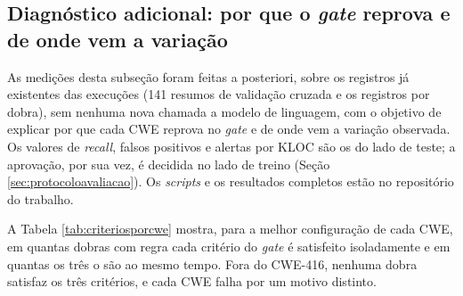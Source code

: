 \documentclass[
    12pt,                %
    openright,           %
    oneside,             %
    a4paper,             %
    english,             %
    brazil               %
]{abntex2}
\newcommand{\novo}[1]{{\color{red}#1}}
\begin{document}
\subsection{Diagnóstico adicional: por que o \textit{gate} reprova e de onde vem a variação}
\label{sec:diagnosticoadicional}
\par
\novo{As medições desta subseção foram feitas a posteriori, sobre os registros já existentes das execuções (141 resumos de validação cruzada e os registros por dobra), sem nenhuma nova chamada a modelo de linguagem, com o objetivo de explicar por que cada CWE reprova no \textit{gate} e de onde vem a variação observada. Os valores de \textit{recall}, falsos positivos e alertas por KLOC são os do lado de teste; a aprovação, por sua vez, é decidida no lado de treino (Seção \ref{sec:protocoloavaliacao}). Os \textit{scripts} e os resultados completos estão no repositório do trabalho.}
\par
\novo{A Tabela \ref{tab:criteriosporcwe} mostra, para a melhor configuração de cada CWE, em quantas dobras com regra cada critério do \textit{gate} é satisfeito isoladamente e em quantas os três o são ao mesmo tempo. Fora do CWE-416, nenhuma dobra satisfaz os três critérios, e cada CWE falha por um motivo distinto.}
\end{document}
